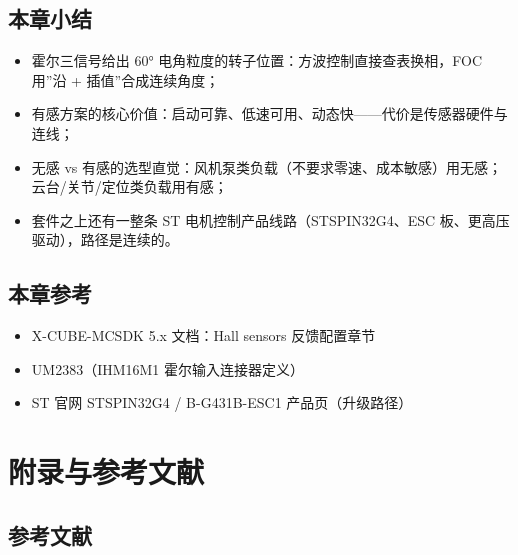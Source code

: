 \documentclass[
  UTF8,
  scheme=plain,
  fontsize=10pt,
  openany
]{ctexbook}
\begin{document}
\section{本章小结}\label{ux672cux7ae0ux5c0fux7ed3-7}

\begin{itemize}
\tightlist
\item
  霍尔三信号给出 60° 电角粒度的转子位置：方波控制直接查表换相，FOC
  用''沿 + 插值''合成连续角度；
\item
  有感方案的核心价值：启动可靠、低速可用、动态快------代价是传感器硬件与连线；
\item
  无感 vs
  有感的选型直觉：风机泵类负载（不要求零速、成本敏感）用无感；云台/关节/定位类负载用有感；
\item
  套件之上还有一整条 ST 电机控制产品线路（STSPIN32G4、ESC
  板、更高压驱动），路径是连续的。
\end{itemize}

\section{本章参考}\label{ux672cux7ae0ux53c2ux8003-7}

\begin{itemize}
\tightlist
\item
  X-CUBE-MCSDK 5.x 文档：Hall sensors 反馈配置章节
\item
  UM2383（IHM16M1 霍尔输入连接器定义）
\item
  ST 官网 STSPIN32G4 / B-G431B-ESC1 产品页（升级路径）
\end{itemize}

\clearpage

\chapter*{附录与参考文献}\label{ux9644ux5f55ux4e0eux53c2ux8003ux6587ux732e}

\section*{参考文献}\label{ux53c2ux8003ux6587ux732e}
\end{document}
